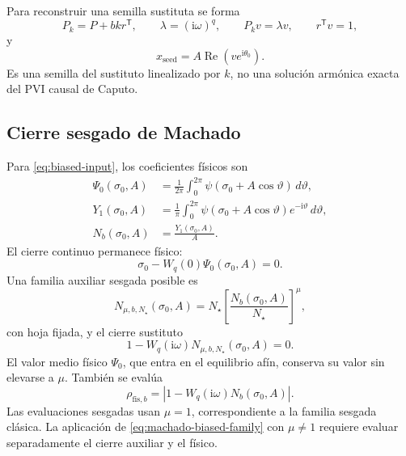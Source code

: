 Para reconstruir una semilla sustituta se forma
\begin{equation}
 P_k=P+bkr^{\mathsf T},\qquad
 \lambda=(\mathrm i\omega)^q,\qquad
 P_kv=\lambda v,\qquad r^{\mathsf T}v=1,
 \label{eq:machado-modal}
\end{equation}
y
\begin{equation}
 x_{\mathrm{seed}}=A\operatorname{Re}(ve^{\mathrm i\theta_0}).
 \label{eq:machado-seed}
\end{equation}
Es una semilla del sustituto linealizado por \(k\), no una solución armónica
exacta del PVI causal de Caputo.

\subsection{Cierre sesgado de Machado}

Para \cref{eq:biased-input}, los coeficientes físicos son
\begin{align}
 \Psi_0(\sigma_0,A)
 &=\frac{1}{2\pi}\int_0^{2\pi}
 \psi(\sigma_0+A\cos\vartheta)\,d\vartheta,
 \label{eq:machado-biased-dc}\\
 Y_1(\sigma_0,A)
 &=\frac{1}{\pi}\int_0^{2\pi}
 \psi(\sigma_0+A\cos\vartheta)e^{-\mathrm i\vartheta}\,d\vartheta,
 \label{eq:machado-biased-y1}\\
 N_b(\sigma_0,A)&=\frac{Y_1(\sigma_0,A)}{A}.
 \label{eq:machado-biased-df}
\end{align}
El cierre continuo permanece físico:
\begin{equation}
 \sigma_0-W_q(0)\Psi_0(\sigma_0,A)=0.
 \label{eq:machado-biased-dc-closure}
\end{equation}
Una familia auxiliar sesgada posible es
\begin{equation}
 N_{\mu,b,N_\star}(\sigma_0,A)
 =N_\star\left[\frac{N_b(\sigma_0,A)}{N_\star}\right]^\mu,
 \label{eq:machado-biased-family}
\end{equation}
con hoja fijada, y el cierre sustituto
\begin{equation}
 1-W_q(\mathrm i\omega)N_{\mu,b,N_\star}(\sigma_0,A)=0.
 \label{eq:machado-biased-closure}
\end{equation}
El valor medio físico \(\Psi_0\), que entra en el equilibrio afín, conserva su
valor sin elevarse a \(\mu\). También se evalúa
\begin{equation}
 \rho_{\mathrm{fis},b}
 =\left|1-W_q(\mathrm i\omega)N_b(\sigma_0,A)\right|.
 \label{eq:machado-biased-physical-residual}
\end{equation}
Las evaluaciones sesgadas usan \(\mu=1\), correspondiente a la familia
sesgada clásica. La aplicación de \cref{eq:machado-biased-family} con
\(\mu\neq1\) requiere evaluar separadamente el cierre auxiliar y el físico.

